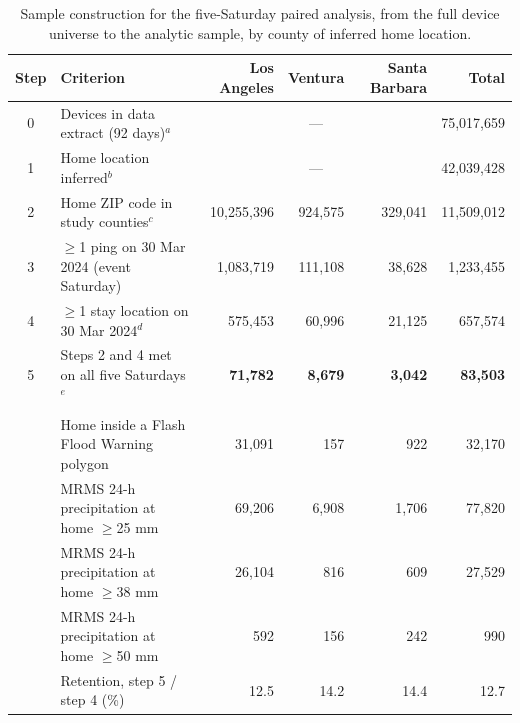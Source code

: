 
\begin{table}[ht]
\centering
\small
\caption{Sample construction for the five-Saturday paired analysis, from the full device universe to the analytic sample, by county of inferred home location.}
\label{tab:sample_construction}
\begin{tabular}{|c|l|r|r|r|r|}
\hline
\rowcolor{rowgray}
\textbf{Step} & \textbf{Criterion} & \textbf{Los Angeles} & \textbf{Ventura} & \textbf{Santa Barbara} & \textbf{Total} \\
\hline
0 & Devices in data extract (92 days)$^{a}$ & \multicolumn{3}{c|}{---} & 75,017,659 \\
1 & Home location inferred$^{b}$ & \multicolumn{3}{c|}{---} & 42,039,428 \\
2 & Home ZIP code in study counties$^{c}$ & 10,255,396 & 924,575 & 329,041 & 11,509,012 \\
3 & $\geq$1 ping on 30 Mar 2024 (event Saturday) & 1,083,719 & 111,108 & 38,628 & 1,233,455 \\
4 & $\geq$1 stay location on 30 Mar 2024$^{d}$ & 575,453 & 60,996 & 21,125 & 657,574 \\
5 & Steps 2 and 4 met on all five Saturdays$^{e}$ & \textbf{71,782} & \textbf{8,679} & \textbf{3,042} & \textbf{83,503} \\
\hline
\rowcolor{rowgray}
\multicolumn{6}{|l|}{\textit{Exposure groups within the analytic sample (step 5)}} \\
\hline
 & Home inside a Flash Flood Warning polygon & 31,091 & 157 & 922 & 32,170 \\
 & MRMS 24-h precipitation at home $\geq$25 mm & 69,206 & 6,908 & 1,706 & 77,820 \\
 & MRMS 24-h precipitation at home $\geq$38 mm & 26,104 & 816 & 609 & 27,529 \\
 & MRMS 24-h precipitation at home $\geq$50 mm & 592 & 156 & 242 & 990 \\
\hline
 & Retention, step 5 / step 4 (\%) & 12.5 & 14.2 & 14.4 & 12.7 \\
\hline
\end{tabular}


\end{table}
